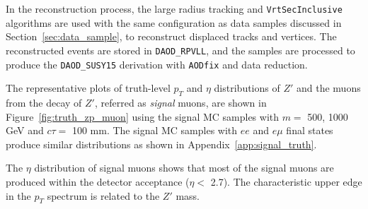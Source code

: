 In the reconstruction process, the large radius tracking and \texttt{VrtSecInclusive} algorithms are used with the same configuration as data samples discussed in Section~\ref{sec:data_sample}, to reconstruct displaced tracks and vertices. The reconstructed events are stored in \texttt{DAOD\_RPVLL}, and the samples are processed to produce the \texttt{DAOD\_SUSY15} derivation with \texttt{AODfix} and data reduction. 

The representative plots of truth-level $p_{T}$ and $\eta$ distributions of $Z'$ and the muons from the decay of $Z'$, referred as \textit{signal} muons, are shown in Figure~\ref{fig:truth_zp_muon} using the signal MC samples with $m=$ 500, 1000 GeV and $c\tau=$ 100 mm. The signal MC samples with $ee$ and $e\mu$ final states produce similar distributions as shown in Appendix~\ref{app:signal_truth}.

The $\eta$ distribution of signal muons shows that most of the signal muons are produced within the detector acceptance ($\eta <$ 2.7). The characteristic upper edge in the $p_{T}$ spectrum is related to the $Z'$ mass.



